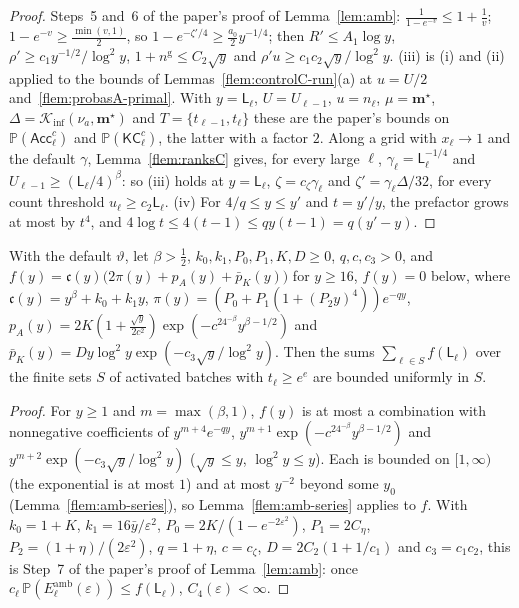 \documentclass[11pt]{article}
\newcommand{\PP}{\mathbb{P}}
\newcommand{\Kinf}{\mathcal K_{\inf}}
\begin{document}
\begin{proof}
Steps~5 and~6 of the paper's proof of Lemma~\ref{lem:amb}: $\frac1{1-e^{-v}}\le1+\frac1v$; $1-e^{-v}\ge\frac{\min(v,1)}2$, so
$1-e^{-\zeta'/4}\ge\frac{a_0}2y^{-1/4}$; then $R'\le A_1\log y$, $\rho'\ge c_1y^{-1/2}/\log^2y$, $1+n^{\mathrm g}\le C_2\sqrt y$ and
$\rho'u\ge c_1c_2\sqrt y/\log^2y$. (iii) is (i) and (ii) applied to the bounds of Lemmas~\ref{flem:controlC-run}(a) at
$u=U/2$ and~\ref{flem:probasA-primal}. With $y=\mathsf L_\ell$, $U=U_{\ell-1}$, $u=n_\ell$, $\mu=\mathbf m^\star$, $\Delta=\Kinf(\nu_a,\mathbf m^\star)$ and
$T=\{t_{\ell-1},t_\ell\}$ these are the paper's bounds on $\PP(\mathsf{Acc}_\ell^c)$ and $\PP(\mathsf{KC}_\ell^c)$, the latter with a
factor $2$. Along a grid with $x_\ell\to1$ and the default $\gamma$, Lemma~\ref{flem:ranksC} gives, for every large $\ell$,
$\gamma_\ell=\mathsf L_\ell^{-1/4}$ and $U_{\ell-1}\ge(\mathsf L_\ell/4)^\beta$: so (iii) holds at $y=\mathsf L_\ell$, $\zeta=c_\zeta\gamma_\ell$ and
$\zeta'=\gamma_\ell\Delta/32$, for every count threshold $u_\ell\ge c_2\mathsf L_\ell$. (iv) For $4/q\le y\le y'$ and $t=y'/y$,
the prefactor grows at most by $t^4$, and $4\log t\le4(t-1)\le qy(t-1)=q(y'-y)$.
\end{proof}

\begin{lemma}\label{flem:amb-series-f}
With the default $\vartheta$, let $\beta>\frac12$, $k_0,k_1,P_0,P_1,K,D\ge0$, $q,c,c_3>0$, and
$f(y)=\mathfrak c(y)\big(2\pi(y)+p_A(y)+\bar p_K(y)\big)$ for $y\ge16$, $f(y)=0$ below, where $\mathfrak c(y)=y^\beta+k_0+k_1y$,
$\pi(y)=(P_0+P_1(1+(P_2y)^4))e^{-qy}$, $p_A(y)=2K(1+\frac{\sqrt y}{2c^2})\exp(-c^24^{-\beta}y^{\beta-1/2})$ and
$\bar p_K(y)=Dy\log^2y\exp(-c_3\sqrt y/\log^2y)$. Then the sums $\sum_{\ell\in S}f(\mathsf L_\ell)$ over the finite sets $S$ of
activated batches with $t_\ell\ge e^e$ are bounded uniformly in $S$.
\end{lemma}

\begin{proof}
For $y\ge1$ and $m=\max(\beta,1)$, $f(y)$ is at most a combination with nonnegative coefficients of
$y^{m+4}e^{-qy}$, $y^{m+1}\exp(-c^24^{-\beta}y^{\beta-1/2})$ and $y^{m+2}\exp(-c_3\sqrt y/\log^2y)$ ($\sqrt y\le y$, $\log^2y\le y$).
Each is bounded on $[1,\infty)$ (the exponential is at most $1$) and at most $y^{-2}$ beyond some $y_0$ (Lemma~\ref{flem:amb-series}), so
Lemma~\ref{flem:amb-series} applies to $f$. With $k_0=1+K$, $k_1=16\bar y/\varepsilon^2$, $P_0=2K/(1-e^{-2\varepsilon^2})$,
$P_1=2C_\eta$, $P_2=(1+\eta)/(2\varepsilon^2)$, $q=1+\eta$, $c=c_\zeta$, $D=2C_2(1+1/c_1)$ and $c_3=c_1c_2$, this is Step~7 of the
paper's proof of Lemma~\ref{lem:amb}: once $c_\ell\,\PP(E^{\mathrm{amb}}_\ell(\varepsilon))\le f(\mathsf L_\ell)$, $C_4(\varepsilon)<\infty$.
\end{proof}
\end{document}
